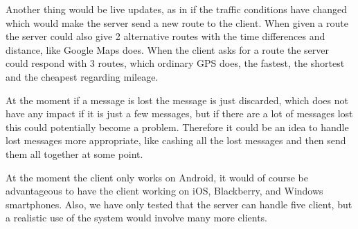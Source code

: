 Another thing would be live updates, as in if the traffic conditions have changed which would make the server send a new route to the client. When given a route the server could also give 2 alternative routes with the time differences and distance, like Google Maps does.
When the client asks for a route the server could respond with 3 routes, which ordinary GPS does, the fastest, the shortest and the cheapest regarding  mileage.

At the moment if a message is lost the message is just discarded, which does not have any impact if it is just a few messages, but if there are a lot of messages lost this could potentially become a problem. Therefore it could be an idea to handle lost messages more appropriate, like cashing all the lost messages and then send them all together at some point.

At the moment the client only works on Android, it would of course be advantageous to have the client working on iOS, Blackberry, and Windows smartphones. Also, we have only tested that the server can handle five client, but a realistic use of the system would involve many more clients.